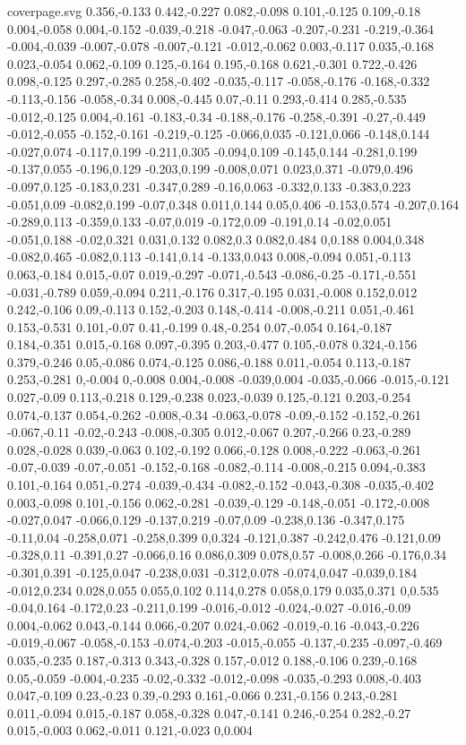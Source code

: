 \begin{filecontents}[noheader]{coverpage.svg}
0.356,-0.133 0.442,-0.227 0.082,-0.098 0.101,-0.125 0.109,-0.18 0.004,-0.058 0.004,-0.152 -0.039,-0.218 -0.047,-0.063 -0.207,-0.231 -0.219,-0.364 -0.004,-0.039 -0.007,-0.078 -0.007,-0.121 -0.012,-0.062 0.003,-0.117 0.035,-0.168 0.023,-0.054 0.062,-0.109 0.125,-0.164 0.195,-0.168 0.621,-0.301 0.722,-0.426 0.098,-0.125 0.297,-0.285 0.258,-0.402 -0.035,-0.117 -0.058,-0.176 -0.168,-0.332 -0.113,-0.156 -0.058,-0.34 0.008,-0.445 0.07,-0.11 0.293,-0.414 0.285,-0.535 -0.012,-0.125 0.004,-0.161 -0.183,-0.34 -0.188,-0.176 -0.258,-0.391 -0.27,-0.449 -0.012,-0.055 -0.152,-0.161 -0.219,-0.125 -0.066,0.035 -0.121,0.066 -0.148,0.144 -0.027,0.074 -0.117,0.199 -0.211,0.305 -0.094,0.109 -0.145,0.144 -0.281,0.199 -0.137,0.055 -0.196,0.129 -0.203,0.199 -0.008,0.071 0.023,0.371 -0.079,0.496 -0.097,0.125 -0.183,0.231 -0.347,0.289 -0.16,0.063 -0.332,0.133 -0.383,0.223 -0.051,0.09 -0.082,0.199 -0.07,0.348 0.011,0.144 0.05,0.406 -0.153,0.574 -0.207,0.164 -0.289,0.113 -0.359,0.133 -0.07,0.019 -0.172,0.09 -0.191,0.14 -0.02,0.051 -0.051,0.188 -0.02,0.321 0.031,0.132 0.082,0.3 0.082,0.484 0,0.188 0.004,0.348 -0.082,0.465 -0.082,0.113 -0.141,0.14 -0.133,0.043 0.008,-0.094 0.051,-0.113 0.063,-0.184 0.015,-0.07 0.019,-0.297 -0.071,-0.543 -0.086,-0.25 -0.171,-0.551 -0.031,-0.789 0.059,-0.094 0.211,-0.176 0.317,-0.195 0.031,-0.008 0.152,0.012 0.242,-0.106 0.09,-0.113 0.152,-0.203 0.148,-0.414 -0.008,-0.211 0.051,-0.461 0.153,-0.531 0.101,-0.07 0.41,-0.199 0.48,-0.254 0.07,-0.054 0.164,-0.187 0.184,-0.351 0.015,-0.168 0.097,-0.395 0.203,-0.477 0.105,-0.078 0.324,-0.156 0.379,-0.246 0.05,-0.086 0.074,-0.125 0.086,-0.188 0.011,-0.054 0.113,-0.187 0.253,-0.281 0,-0.004 0,-0.008 0.004,-0.008 -0.039,0.004 -0.035,-0.066 -0.015,-0.121 0.027,-0.09 0.113,-0.218 0.129,-0.238 0.023,-0.039 0.125,-0.121 0.203,-0.254 0.074,-0.137 0.054,-0.262 -0.008,-0.34 -0.063,-0.078 -0.09,-0.152 -0.152,-0.261 -0.067,-0.11 -0.02,-0.243 -0.008,-0.305 0.012,-0.067 0.207,-0.266 0.23,-0.289 0.028,-0.028 0.039,-0.063 0.102,-0.192 0.066,-0.128 0.008,-0.222 -0.063,-0.261 -0.07,-0.039 -0.07,-0.051 -0.152,-0.168 -0.082,-0.114 -0.008,-0.215 0.094,-0.383 0.101,-0.164 0.051,-0.274 -0.039,-0.434 -0.082,-0.152 -0.043,-0.308 -0.035,-0.402 0.003,-0.098 0.101,-0.156 0.062,-0.281 -0.039,-0.129 -0.148,-0.051 -0.172,-0.008 -0.027,0.047 -0.066,0.129 -0.137,0.219 -0.07,0.09 -0.238,0.136 -0.347,0.175 -0.11,0.04 -0.258,0.071 -0.258,0.399 0,0.324 -0.121,0.387 -0.242,0.476 -0.121,0.09 -0.328,0.11 -0.391,0.27 -0.066,0.16 0.086,0.309 0.078,0.57 -0.008,0.266 -0.176,0.34 -0.301,0.391 -0.125,0.047 -0.238,0.031 -0.312,0.078 -0.074,0.047 -0.039,0.184 -0.012,0.234 0.028,0.055 0.055,0.102 0.114,0.278 0.058,0.179 0.035,0.371 0,0.535 -0.04,0.164 -0.172,0.23 -0.211,0.199 -0.016,-0.012 -0.024,-0.027 -0.016,-0.09 0.004,-0.062 0.043,-0.144 0.066,-0.207 0.024,-0.062 -0.019,-0.16 -0.043,-0.226 -0.019,-0.067 -0.058,-0.153 -0.074,-0.203 -0.015,-0.055 -0.137,-0.235 -0.097,-0.469 0.035,-0.235 0.187,-0.313 0.343,-0.328 0.157,-0.012 0.188,-0.106 0.239,-0.168 0.05,-0.059 -0.004,-0.235 -0.02,-0.332 -0.012,-0.098 -0.035,-0.293 0.008,-0.403 0.047,-0.109 0.23,-0.23 0.39,-0.293 0.161,-0.066 0.231,-0.156 0.243,-0.281 0.011,-0.094 0.015,-0.187 0.058,-0.328 0.047,-0.141 0.246,-0.254 0.282,-0.27 0.015,-0.003 0.062,-0.011 0.121,-0.023 0,0.004 
\end{filecontents}
